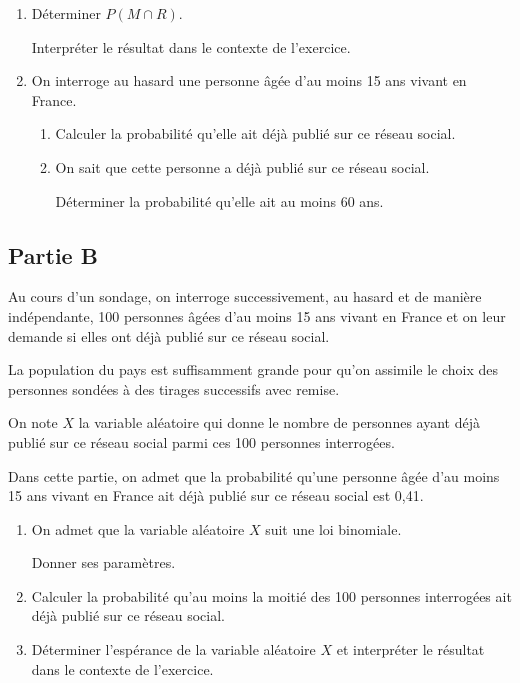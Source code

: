 \begin{enumerate}
	\item Déterminer $P(M \cap R)$.

	Interpréter le résultat dans le contexte de l'exercice.

	\item On interroge au hasard une personne âgée d'au moins 15 ans vivant en France.

	\begin{enumerate}
		\item Calculer la probabilité qu'elle ait déjà publié sur ce réseau social.

		\item On sait que cette personne a déjà publié sur ce réseau social.

		Déterminer la probabilité qu'elle ait au moins 60 ans.
	\end{enumerate}
\end{enumerate}

\subsection*{Partie B}
Au cours d'un sondage, on interroge successivement, au hasard et de manière indépendante, 100 personnes âgées d'au moins 15 ans vivant en France et on leur demande si elles ont déjà publié sur ce réseau social.

La population du pays est suffisamment grande pour qu'on assimile le choix des personnes sondées à des tirages successifs avec remise.

On note $X$ la variable aléatoire qui donne le nombre de personnes ayant déjà publié sur ce réseau social parmi ces 100 personnes interrogées.

Dans cette partie, on admet que la probabilité qu'une personne âgée d'au moins 15 ans vivant en France ait déjà publié sur ce réseau social est 0,41.

\begin{enumerate}
	\item On admet que la variable aléatoire $X$ suit une loi binomiale.

	Donner ses paramètres.

	\item Calculer la probabilité qu'au moins la moitié des 100 personnes interrogées ait déjà publié sur ce réseau social.

	\item Déterminer l'espérance de la variable aléatoire $X$ et interpréter le résultat dans le contexte de l'exercice.
\end{enumerate}


